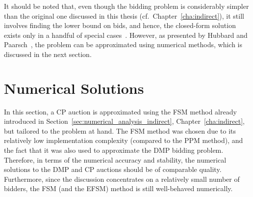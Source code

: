 It should be noted that, even though the bidding problem is considerably simpler than the original one discussed in this thesis (cf.~Chapter~\ref{cha:indirect}), it still involves finding the lower bound on bids, and hence, the closed-form solution exists only in a handful of special cases~\cite{Krishna10,HubbardPaarsch2011}. However, as presented by Hubbard and Paarsch~\cite{HubbardPaarsch2011}, the problem can be approximated using numerical methods, which is discussed in the next section.

\section{Numerical Solutions} %
\label{sec:numerical_solutions}
In this section, a CP auction is approximated using the FSM method already introduced in Section~\ref{sec:numerical_analysis_indirect}, Chapter~\ref{cha:indirect}, but tailored to the problem at hand. The FSM method was chosen due to its relatively low implementation complexity (compared to the PPM method), and the fact that it was also used to approximate the DMP bidding problem. Therefore, in terms of the numerical accuracy and stability, the numerical solutions to the DMP and CP auctions should be of comparable quality. Furthermore, since the discussion concentrates on a relatively small number of bidders, the FSM (and the EFSM) method is still well-behaved numerically.

